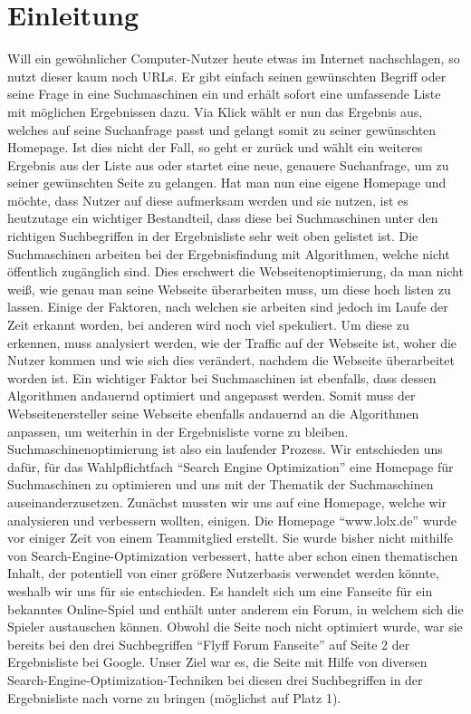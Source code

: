 \chapter{Einleitung}


Will ein gewöhnlicher Computer-Nutzer heute etwas im Internet nachschlagen, so nutzt dieser kaum noch URLs. 
Er gibt einfach seinen gewünschten Begriff oder seine Frage in eine Suchmaschinen ein und erhält sofort eine umfassende Liste mit möglichen Ergebnissen dazu. Via Klick wählt er nun das Ergebnis aus, welches auf seine Suchanfrage passt und gelangt somit zu seiner gewünschten Homepage. Ist dies nicht der Fall, so geht er zurück und wählt ein weiteres Ergebnis aus der Liste aus oder startet eine neue, genauere Suchanfrage, um zu seiner gewünschten Seite zu gelangen.
Hat man nun eine eigene Homepage und möchte, dass Nutzer auf diese aufmerksam werden und sie nutzen, ist es heutzutage ein wichtiger Bestandteil, dass diese bei Suchmaschinen unter den richtigen Suchbegriffen in der Ergebnisliste sehr weit oben gelistet ist.
Die Suchmaschinen arbeiten bei der Ergebnisfindung mit Algorithmen, welche nicht öffentlich zugänglich sind. Dies erschwert die Webseitenoptimierung, da man nicht weiß, wie genau man seine Webseite überarbeiten muss, um diese hoch listen zu lassen. 
Einige der Faktoren, nach welchen sie arbeiten sind jedoch im Laufe der Zeit erkannt worden, bei anderen wird noch viel spekuliert. Um diese zu erkennen, muss analysiert werden, wie der Traffic auf der Webseite ist, woher die Nutzer kommen und wie sich dies verändert, nachdem die Webseite überarbeitet worden ist.
Ein wichtiger Faktor bei Suchmaschinen ist ebenfalls, dass dessen Algorithmen andauernd optimiert und angepasst werden. Somit muss der Webseitenersteller seine Webseite ebenfalls andauernd an die Algorithmen anpassen, um weiterhin in der Ergebnisliste vorne zu bleiben. Suchmaschinenoptimierung ist also ein laufender Prozess.
Wir entschieden uns dafür, für das Wahlpflichtfach “Search Engine Optimization” eine Homepage für Suchmaschinen zu optimieren und uns mit der Thematik der Suchmaschinen auseinanderzusetzen.
Zunächst mussten wir uns auf eine Homepage, welche wir analysieren und verbessern wollten, einigen.
Die Homepage “www.lolx.de” wurde vor einiger Zeit von einem Teammitglied erstellt. Sie wurde bisher nicht mithilfe von Search-Engine-Optimization verbessert, hatte aber schon einen thematischen Inhalt, der potentiell von einer größere Nutzerbasis verwendet werden könnte, weshalb wir uns für sie entschieden.
Es handelt sich um eine Fanseite für ein bekanntes Online-Spiel und enthält unter anderem ein Forum, in welchem sich die Spieler austauschen können.
Obwohl die Seite noch nicht optimiert wurde, war sie bereits bei den drei Suchbegriffen “Flyff Forum Fanseite” auf Seite 2 der Ergebnisliste bei Google.
Unser Ziel war es, die Seite  mit Hilfe von diversen Search-Engine-Optimization-Techniken bei diesen drei Suchbegriffen in der Ergebnisliste nach vorne zu bringen (möglichst auf Platz 1).
